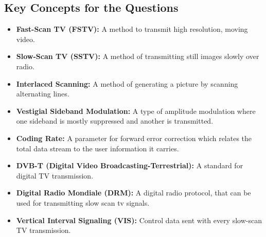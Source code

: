 \subsection*{Key Concepts for the Questions}
\begin{itemize}
    \item \textbf{Fast-Scan TV (FSTV):} A method to transmit high resolution, moving video.
    \item \textbf{Slow-Scan TV (SSTV):} A method of transmitting still images slowly over radio.
    \item \textbf{Interlaced Scanning:} A method of generating a picture by scanning alternating lines.
    \item \textbf{Vestigial Sideband Modulation:} A type of amplitude modulation where one sideband is mostly suppressed and another is transmitted.
    \item \textbf{Coding Rate:}  A parameter for forward error correction which relates the total data stream to the user information it carries.
      \item \textbf{DVB-T (Digital Video Broadcasting-Terrestrial):} A standard for digital TV transmission.
     \item \textbf{Digital Radio Mondiale (DRM):} A digital radio protocol, that can be used for transmitting slow scan tv signals.
         \item \textbf{Vertical Interval Signaling (VIS):} Control data sent with every slow-scan TV transmission.
\end{itemize}

